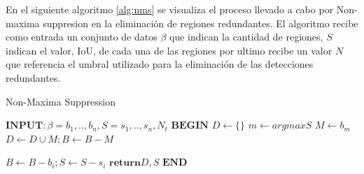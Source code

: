 En el siguiente algoritmo  \ref{alg:nms} se visualiza el proceso llevado a cabo por Non-maxima suppresion en la eliminación de regiones redundantes.  El algoritmo recibe como entrada un conjunto de datos $\beta$ que indican la cantidad de regiones, $S$  indican el valor, IoU, de cada una de las regiones por ultimo recibe un valor $N$ que  referencia el umbral utilizado para la  eliminación de las detecciones redundantes. 
\begin{algorithm}[H]\caption{Non-Maxima Suppression}\label{alg:nms}

\begin{algorithmic}[1]
\State $\textbf{INPUT} : \beta = {b_1,..,b_n}, S = {s_1,..,s_n}, N_t$
\State $ \textbf{BEGIN} $
\State $D \gets \{\}$
    \State $ m\gets  argmax S $
    \State $ M \gets b_m $
    \State $ D \gets D \cup M; B \gets B - M $
    
            \State $ B \gets B - b_i; S \gets S - s_i $
\EndIf
\EndFor
\EndWhile
\State $\textbf{return}   D, S $
\State $\textbf{END}$
\end{algorithmic}
\end{algorithm}